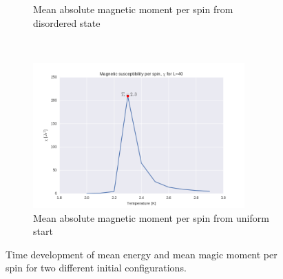 \documentclass[a4paper, 10pt]{article}
\begin{document}
\begin{figure}[!ht]
\begin{subfigure}[H!]{0.5\textwidth}
        \caption{Mean absolute magnetic moment per spin from disordered state}
    \end{subfigure}%
    ~ 
    \begin{subfigure}[H!]{0.5\textwidth}
        \centering
        \includegraphics[height=2.2in]{chil40Ne5.png}
        \caption{Mean absolute magnetic moment per spin from uniform start}
    \end{subfigure}
      \caption{Time development of mean energy and mean magic moment per spin for two different initial configurations.}
\end{figure}
\end{document}
